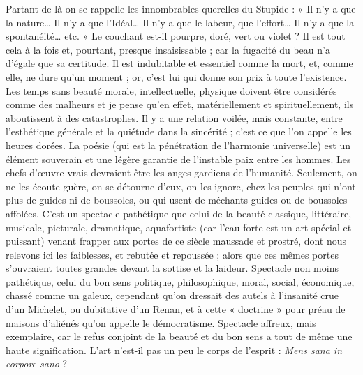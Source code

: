 \documentclass[french,twoside]{book} %
\begin{document}
Partant de là on se rappelle les innombrables querelles du Stupide : « Il n’y a que la nature… Il n’y a que l’Idéal… Il n’y a que le labeur, que l’effort… Il n’y a que la spontanéité… etc. » Le couchant est-il pourpre, doré, vert ou violet ? Il est tout cela à la fois et, pourtant, presque insaisissable ; car la fugacité du beau n’a d’égale que sa certitude. Il est indubitable et essentiel comme la mort, et, comme elle, ne dure qu’un moment ; or, c’est lui qui donne son prix à toute l’existence. Les temps sans beauté morale, intellectuelle, physique doivent être considérés comme des malheurs et je pense qu’en effet, matériellement et spirituellement, ils aboutissent à des catastrophes. Il y a une relation voilée, mais constante, entre l’esthétique générale et la quiétude dans la sincérité ; c’est ce que l’on appelle les heures dorées. La poésie (qui est la pénétration de l’harmonie universelle) est un élément souverain et une légère garantie de l’instable paix entre les hommes. Les chefs-d’œuvre vrais devraient être les anges gardiens de l’humanité. Seulement, on ne les écoute guère, on se détourne d’eux, on les ignore, chez les peuples qui n’ont plus de guides ni de boussoles, ou qui usent de méchants guides ou de boussoles affolées. C’est un spectacle pathétique que celui de la beauté classique, littéraire, musicale, picturale, dramatique, aquafortiste (car l’eau-forte est un art spécial et puissant) venant frapper aux portes de ce siècle maussade et prostré, dont nous relevons ici les faiblesses, et rebutée et repoussée ; alors que ces mêmes portes s’ouvraient toutes grandes devant la sottise et la laideur. Spectacle non moins pathétique, celui du bon sens politique, philosophique, moral, social, économique, chassé comme un galeux, cependant qu’on dressait des autels à l’insanité crue d’un Michelet, ou dubitative d’un Renan, et à cette « doctrine » pour préau de maisons d’aliénés qu’on appelle le démocratisme. Spectacle affreux, mais exemplaire, car le refus conjoint de la beauté et du bon sens a tout de même une haute signification. L’art n’est-il pas un peu le corps de l’esprit : {\itshape Mens sana in corpore sano} ?\par
\end{document}
